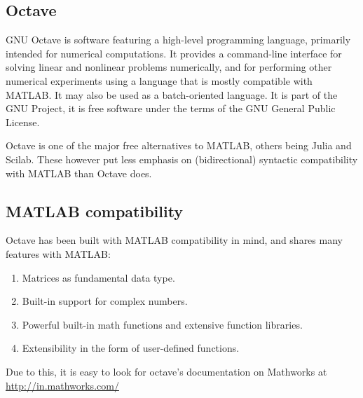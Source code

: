 \documentclass{beamer}
\begin{document}
\begin{frame}

    \section{Octave}
GNU Octave is software featuring a high-level programming language, primarily intended for numerical computations. It provides a command-line interface for solving linear and nonlinear problems numerically, and for performing other numerical experiments using a language that is mostly compatible with MATLAB. It may also be used as a batch-oriented language. It is part of the GNU Project, it is free software under the terms of the GNU General Public License.

Octave is one of the major free alternatives to MATLAB, others being Julia and Scilab. These however put less emphasis on (bidirectional) syntactic compatibility with MATLAB than Octave does.
        \subsection{MATLAB compatibility}
Octave has been built with MATLAB compatibility in mind, and shares many features with MATLAB:
            \begin{enumerate}
                    \item
                        Matrices as fundamental data type.
                    \item
                        Built-in support for complex numbers.
                    \item
                        Powerful built-in math functions and extensive function libraries.
                    \item
                        Extensibility in the form of user-defined functions.
            \end{enumerate}
            Due to this, it is easy to look for octave's documentation on Mathworks at \url{http://in.mathworks.com/}
\end{frame}
\end{document}
